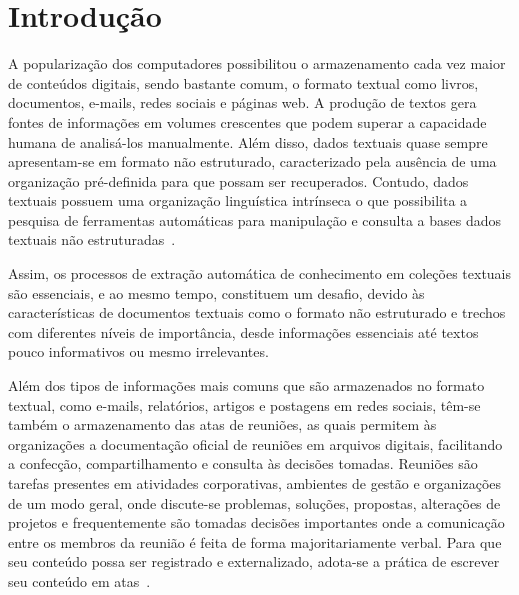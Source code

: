 \chapter{Introdução}\label{cap1}

\let\cleardoublepage\clearpage


A popularização dos computadores possibilitou o armazenamento cada vez maior de conteúdos digitais, sendo bastante comum, o formato textual como livros, documentos, e-mails, redes sociais e páginas web. A produção de textos gera fontes de informações em volumes crescentes que podem superar a capacidade humana de analisá-los manualmente.  %
%
Além disso, dados textuais quase sempre apresentam-se em formato não estruturado, caracterizado pela ausência de uma organização pré-definida para que possam ser recuperados.  %
%
Contudo, dados textuais possuem uma organização linguística intrínseca o que possibilita a pesquisa de ferramentas automáticas para manipulação e consulta a bases dados textuais não estruturadas~\cite{Cao:2017, Manning2008}. 



Assim, os processos de extração automática de conhecimento em coleções textuais são essenciais, e ao mesmo tempo, constituem um desafio, devido às características de documentos textuais como o formato não estruturado e trechos com diferentes níveis de importância, desde informações essenciais até textos pouco informativos ou mesmo irrelevantes. 

Além dos tipos de informações mais comuns que são armazenados no formato textual, como e-mails, relatórios, artigos e postagens em redes sociais, têm-se também o armazenamento das atas de reuniões, as quais permitem às organizações a documentação oficial de reuniões em arquivos digitais, facilitando a confecção, compartilhamento e consulta às decisões tomadas.
% 
% 
% 
Reuniões são tarefas presentes em atividades corporativas, ambientes de gestão e organizações de um modo geral, onde discute-se problemas, soluções, propostas, alterações de projetos e frequentemente são tomadas decisões importantes onde a comunicação entre os membros da reunião é feita de forma majoritariamente verbal. Para que seu conteúdo possa ser registrado e externalizado, adota-se a prática de escrever seu conteúdo em atas~\cite{Miriam2013, Lee2011}.

